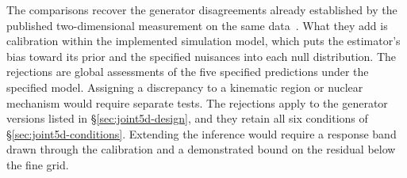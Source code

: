 The comparisons recover the generator disagreements already established by the published two-dimensional measurement on the same data~\cite{MINERvA:2021owq}. What they add is calibration within the implemented simulation model, which puts the estimator's bias toward its prior and the specified nuisances into each null distribution. The rejections are global assessments of the five specified predictions under the specified model. Assigning a discrepancy to a kinematic region or nuclear mechanism would require separate tests. The rejections apply to the generator versions listed in \S\ref{sec:joint5d-design}, and they retain all six conditions of \S\ref{sec:joint5d-conditions}. Extending the inference would require a response band drawn through the calibration and a demonstrated bound on the residual below the fine grid.
